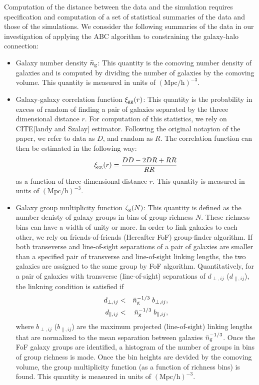 \documentclass[12pt, preprint]{aastex}
\newcommand{\beq}{\begin{equation}}
\newcommand{\eeq}{\end{equation}}
\begin{document}
Computation of the distance between the data and the simulation requires specification and computation of a set of statistical summaries of the data and those of the simulations. We conssider the following summaries of the data in our investigation of applying the ABC algorithm to constraining the galaxy-halo connection:
\begin{itemize}
\item Galaxy number density $\bar{n}_{\mathrm{g}}$: This quantity is the comoving number density of galaxies and is computed by dividing the number of galaxies by the comoving volume. This quantity is measured in units of $(\mathrm{Mpc}/\mathrm{h})^{-3}$.  
\item Galaxy-galaxy correlation function $\xi_{\mathrm{gg}}(r)$: This quantity is the probability in excess of random of finding a pair of galaxies separated by the threee dimensional distance $r$. For computation of this statistics, we rely on CITE[landy and Szalay] estimator. Following the original notayion of the paper, we refer to data as $D$, and random as $R$. The correlation function can then be estimated in the following way:
\beq
\xigg(r) = \frac{DD - 2DR + RR}{RR}
\eeq
as a function of three-dimensional distance $r$. This quantity is measured in units of $(\mathrm{Mpc}/\mathrm{h})^{-3}$.
\item Galaxy group multiplicity function $\mathcal{\zeta}_{\rm g}(N)$: This quantity is defined as the number denisty of galaxy groups in bins of group richness $N$. These richness bins can have a width of unity or more. In order to link galaxies to each other, we rely on friends-of-friends (Hereafter FoF) group-finder algorithm. If both transeverse and line-of-sight separations of a pair of galaxies are smaller than a specified pair of transverse and line-of-sight linking lengths, the two galaxies are assigned to the same group by FoF algorithm. Quantitatively, for a pair of galaxies with transverse (line-of-sight) separations of $d_{\perp , ij}$ ($d_{\parallel , ij}$), the linkning condition is satisfied if
\begin{eqnarray}
d_{\perp , ij} &<& \bar{n}_{\mathrm{g}} ^{-1/3} \; b_{\perp , ij}, \\
d_{\parallel , ij} &<& \bar{n}_{\mathrm{g}} ^{-1/3} \;b_{\parallel , ij},
\end{eqnarray}
where $b_{\perp , ij}$ ($b_{\parallel , ij}$) are the maximum projected (line-of-sight) linking  lengths that are normalized to the mean separation between galaxies $\bar{n}_{\mathrm{g}} ^{-1/3}$. Once the FoF galaxy groups are identified, a histogram of the number of groups in bins of group richness is made. Once the bin heights are devided by the comoving volume, the group multiplicity function (as a function of richness bins) is found. This quantity is measured in units of $(\mathrm{Mpc}/\mathrm{h})^{-3}$.

\end{itemize}
\end{document}
